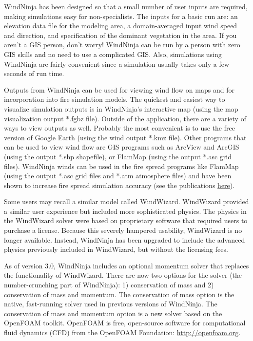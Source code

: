 \documentclass[12pt]{article}
\begin{document}
WindNinja has been designed so that a small number of user inputs are required, making simulations easy for non-specialists.  
The inputs for a basic run are:  an elevation data file for the modeling area, a domain-averaged input wind speed and direction, and specification of the dominant vegetation in the area.  
If you aren't a GIS person, don't worry!  WindNinja can be run by a person with zero GIS skills and no need to use a complicated GIS.  
Also, simulations using WindNinja are fairly convenient since a simulation usually takes only a few seconds of run time.

Outputs from WindNinja can be used for viewing wind flow on maps and for incorporation into fire simulation models.  
The quickest and easiest way to visualize simulation outputs is in WindNinja's interactive map (using the map visualization output *.fgbz file). 
Outside of the application, there are a variety of ways to view outputs as well.
Probably the most convenient is to use the free version of Google Earth (using the wind output *.kmz file).  
Other programs that can be used to view wind flow are GIS programs such as ArcView and ArcGIS (using the output *.shp shapefile), or FlamMap (using the output *.asc grid files).  
WindNinja winds can be used in the fire spread programs like FlamMap (using the output *.asc grid files and *.atm atmosphere files) and have been shown to increase fire spread simulation accuracy (see the publications \href{https://research.fs.usda.gov/firelab/products/dataandtools/windninja}{here}).

Some users may recall a similar model called WindWizard. 
WindWizard provided a similar user experience but included more sophisticated physics. 
The physics in the WindWizard solver were based on proprietary software that required users to purchase a license. 
Because this severely hampered usability, WindWizard is no longer available. 
Instead, WindNinja has been upgraded to include the advanced physics previously included in WindWizard, but without the licensing fees.

As of version 3.0, WindNinja includes an optional momentum solver that replaces the functionality of WindWizard. 
There are now two options for the solver (the number-crunching part of WindNinja): 1) conservation of mass and 2) conservation of mass and momentum. 
The conservation of mass option is the native, fast-running solver used in previous versions of WindNinja. 
The conservation of mass and momentum option is a new solver based on the OpenFOAM toolkit. 
OpenFOAM is free, open-source software for computational fluid dynamics (CFD) from the OpenFOAM Foundation: \url{http://openfoam.org}. 
\end{document}
